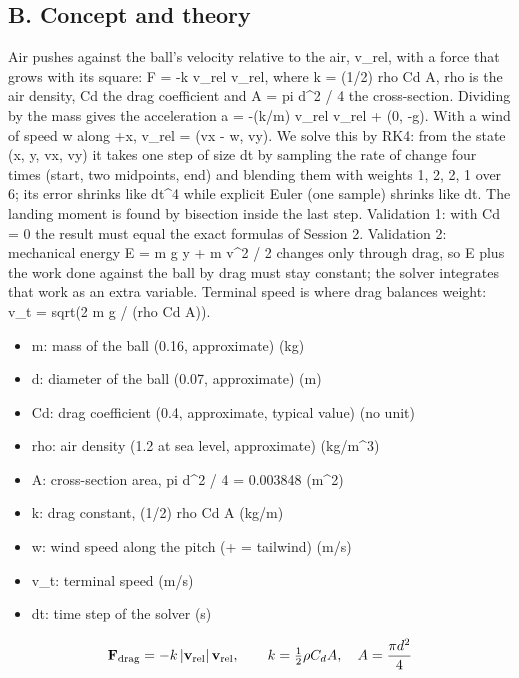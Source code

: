 \documentclass[11pt,a4paper]{article}
\begin{document}
\subsection*{B. Concept and theory}
Air pushes against the ball's velocity relative to the air, v\_rel, with a force that grows with its square: F = -k \textbar{}v\_rel\textbar{} v\_rel, where k = (1/2) rho Cd A, rho is the air density, Cd the drag coefficient and A = pi d\textasciicircum{}2 / 4 the cross-section. Dividing by the mass gives the acceleration a = -(k/m) \textbar{}v\_rel\textbar{} v\_rel + (0, -g). With a wind of speed w along +x, v\_rel = (vx - w, vy). We solve this by RK4: from the state (x, y, vx, vy) it takes one step of size dt by sampling the rate of change four times (start, two midpoints, end) and blending them with weights 1, 2, 2, 1 over 6; its error shrinks like dt\textasciicircum{}4 while explicit Euler (one sample) shrinks like dt. The landing moment is found by bisection inside the last step. Validation 1: with Cd = 0 the result must equal the exact formulas of Session 2. Validation 2: mechanical energy E = m g y + m v\textasciicircum{}2 / 2 changes only through drag, so E plus the work done against the ball by drag must stay constant; the solver integrates that work as an extra variable. Terminal speed is where drag balances weight: v\_t = sqrt(2 m g / (rho Cd A)).

\begin{itemize}[nosep]
\item m: mass of the ball (0.16, approximate) (kg)
\item d: diameter of the ball (0.07, approximate) (m)
\item Cd: drag coefficient (0.4, approximate, typical value) (no unit)
\item rho: air density (1.2 at sea level, approximate) (kg/m\textasciicircum{}3)
\item A: cross-section area, pi d\textasciicircum{}2 / 4 = 0.003848 (m\textasciicircum{}2)
\item k: drag constant, (1/2) rho Cd A (kg/m)
\item w: wind speed along the pitch (+ = tailwind) (m/s)
\item v\_t: terminal speed (m/s)
\item dt: time step of the solver (s)
\end{itemize}

\begin{equation*}
\mathbf F_{\rm drag}=-k\,|\mathbf v_{\rm rel}|\,\mathbf v_{\rm rel},\qquad k=\tfrac12\rho C_d A,\quad A=\frac{\pi d^2}{4}
\end{equation*}
\end{document}
